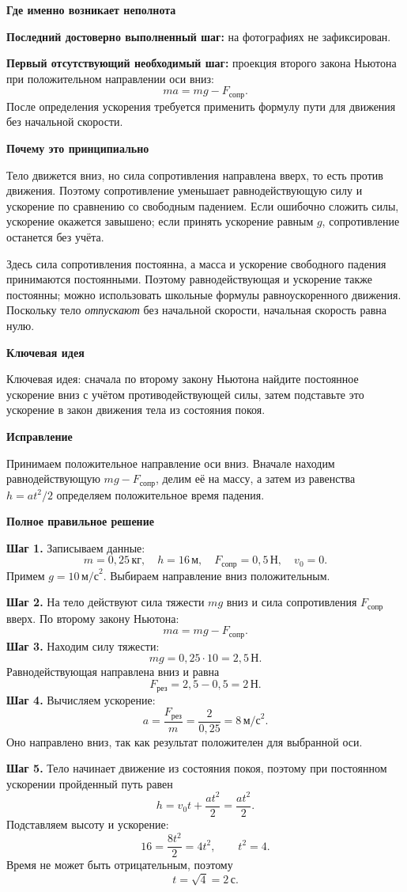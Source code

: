 \documentclass[12pt,a4paper]{article}
\newcommand{\reviewfield}[1]{\par\smallskip\noindent\textbf{#1}\par}
\newcommand{\mathunit}[1]{\,\text{#1}}
\begin{document}
\reviewfield{Где именно возникает неполнота}
\textbf{Последний достоверно выполненный шаг:} на фотографиях не зафиксирован.

\textbf{Первый отсутствующий необходимый шаг:} проекция второго закона Ньютона при положительном направлении оси вниз:
\[
ma=mg-F_{\text{сопр}}.
\]
После определения ускорения требуется применить формулу пути для движения без начальной скорости.

\reviewfield{Почему это принципиально}
Тело движется вниз, но сила сопротивления направлена вверх, то есть против движения. Поэтому сопротивление уменьшает равнодействующую силу и ускорение по сравнению со свободным падением. Если ошибочно сложить силы, ускорение окажется завышено; если принять ускорение равным $g$, сопротивление останется без учёта.

Здесь сила сопротивления постоянна, а масса и ускорение свободного падения принимаются постоянными. Поэтому равнодействующая и ускорение также постоянны; можно использовать школьные формулы равноускоренного движения. Поскольку тело \emph{отпускают} без начальной скорости, начальная скорость равна нулю.

\reviewfield{Ключевая идея}
\textcolor{blue!60!black}{Ключевая идея:} сначала по второму закону Ньютона найдите постоянное ускорение вниз с учётом противодействующей силы, затем подставьте это ускорение в закон движения тела из состояния покоя.

\reviewfield{Исправление}
Принимаем положительное направление оси вниз. Вначале находим равнодействующую $mg-F_{\text{сопр}}$, делим её на массу, а затем из равенства $h=at^2/2$ определяем положительное время падения.

\reviewfield{Полное правильное решение}
\textbf{Шаг 1.} Записываем данные:
\[
m=0{,}25\mathunit{кг},\quad h=16\mathunit{м},\quad
F_{\text{сопр}}=0{,}5\mathunit{Н},\quad v_0=0.
\]
Примем $g=10\,\text{м/с}^{2}$. Выбираем направление вниз положительным.

\textbf{Шаг 2.} На тело действуют сила тяжести $mg$ вниз и сила сопротивления $F_{\text{сопр}}$ вверх. По второму закону Ньютона:
\[
ma=mg-F_{\text{сопр}}.
\]
\textbf{Шаг 3.} Находим силу тяжести:
\[
mg=0{,}25\cdot10=2{,}5\mathunit{Н}.
\]
Равнодействующая направлена вниз и равна
\[
F_{\text{рез}}=2{,}5-0{,}5=2\mathunit{Н}.
\]
\textbf{Шаг 4.} Вычисляем ускорение:
\[
a=\frac{F_{\text{рез}}}{m}=\frac{2}{0{,}25}=8\,\text{м/с}^{2}.
\]
Оно направлено вниз, так как результат положителен для выбранной оси.

\textbf{Шаг 5.} Тело начинает движение из состояния покоя, поэтому при постоянном ускорении пройденный путь равен
\[
h=v_0t+\frac{at^2}{2}=\frac{at^2}{2}.
\]
Подставляем высоту и ускорение:
\[
16=\frac{8t^2}{2}=4t^2,
\qquad t^2=4.
\]
Время не может быть отрицательным, поэтому
\[
t=\sqrt{4}=2\mathunit{с}.
\]
\end{document}
